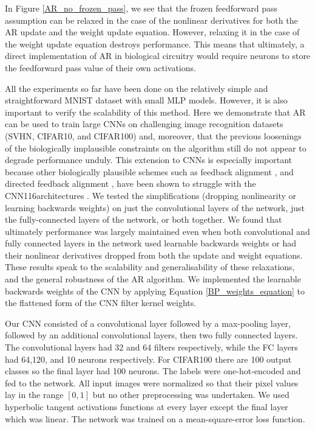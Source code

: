 In Figure \ref{AR_no_frozen_pass}, we see that the frozen feedforward pass assumption can be relaxed in the case of the nonlinear derivatives for both the AR update and the weight update equation. However, relaxing it in the case of the weight update equation destroys performance. This means that ultimately, a direct implementation of AR in biological circuitry would require neurons to store the feedforward pass value of their own activations. 

All the experiments so far have been done on the relatively simple and straightforward MNIST dataset with small MLP models. However, it is also important to verify the scalability of this method. Here we demonstrate that AR can be used to train large CNNs on challenging image recognition datasets (SVHN, CIFAR10, and CIFAR100) and, moreover, that the previous loosenings of the biologically implausible constraints on the algorithm still do not appear to degrade performance unduly. This extension to CNNs is especially important because other biologically plausible schemes such as feedback alignment \citep{lillicrap2016random,lillicrap2014random}, and directed feedback alignment \citep{nokland2016direct}, have been shown to struggle with the CNN116architectures \citep{launay2019principled}. We tested the simplifications (dropping nonlinearity or learning backwards weights) on just the convolutional layers of the network, just the fully-connected layers of the network, or both together. We found that ultimately performance was largely maintained even when both convolutional and fully connected layers in the network used learnable backwards weights or had their nonlinear derivatives dropped from both the update and weight equations. These results speak to the scalability and generalisability of these relaxations, and the general robustness of the AR algorithm. We implemented the learnable backwards weights of the CNN by applying Equation \ref{BP_weights_equation} to the flattened form of the CNN filter kernel weights.

Our CNN consisted of a convolutional layer followed by a max-pooling layer, followed by an additional convolutional layers, then two fully connected layers. The convolutional layers had 32 and 64 filters respectively, while the FC layers had 64,120, and 10 neurons respectively. For CIFAR100 there are 100 output classes so the final layer had 100 neurons. The labels were one-hot-encoded and fed to the network. All input images were normalized so that their pixel values lay in the range $[0,1]$ but no other preprocessing was undertaken. We used hyperbolic tangent activations functions at every layer except the final layer which was linear. The network was trained on a mean-square-error loss function. 

